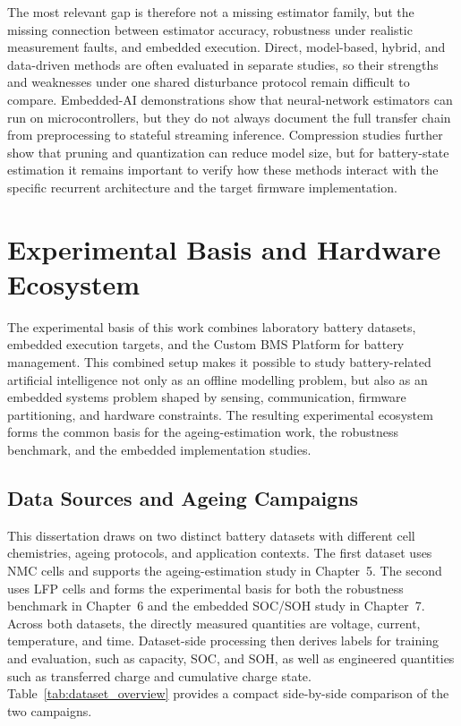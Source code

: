 \documentclass[
    a4paper,
    12pt,
    titlepage,
    bibliography=totoc,
    twoside=on,
    parskip=false,
    numbers=noenddot,
    cleardoublepage=empty,
    DIV=12,
    BCOR=12.0mm,
    headheight=36pt,
    headings=openright
]{scrreprt}
\begin{document}
The most relevant gap is therefore not a missing estimator family, but the missing connection between estimator accuracy, robustness under realistic measurement faults, and embedded execution. Direct, model-based, hybrid, and data-driven methods are often evaluated in separate studies, so their strengths and weaknesses under one shared disturbance protocol remain difficult to compare. Embedded-AI demonstrations show that neural-network estimators can run on microcontrollers, but they do not always document the full transfer chain from preprocessing to stateful streaming inference. Compression studies further show that pruning and quantization can reduce model size, but for battery-state estimation it remains important to verify how these methods interact with the specific recurrent architecture and the target firmware implementation.

\chapter{Experimental Basis and Hardware Ecosystem}
The experimental basis of this work combines laboratory battery datasets, embedded execution targets, and the Custom BMS Platform for battery management. This combined setup makes it possible to study battery-related artificial intelligence not only as an offline modelling problem, but also as an embedded systems problem shaped by sensing, communication, firmware partitioning, and hardware constraints. The resulting experimental ecosystem forms the common basis for the ageing-estimation work, the robustness benchmark, and the embedded implementation studies.

\section{Data Sources and Ageing Campaigns}
\label{sec:datasets}

This dissertation draws on two distinct battery datasets with different cell chemistries, ageing protocols, and application contexts. The first dataset uses NMC cells and supports the ageing-estimation study in Chapter~5. The second uses LFP cells and forms the experimental basis for both the robustness benchmark in Chapter~6 and the embedded SOC/SOH study in Chapter~7. Across both datasets, the directly measured quantities are voltage, current, temperature, and time. Dataset-side processing then derives labels for training and evaluation, such as capacity, SOC, and SOH, as well as engineered quantities such as transferred charge and cumulative charge state. Table~\ref{tab:dataset_overview} provides a compact side-by-side comparison of the two campaigns.
\end{document}
